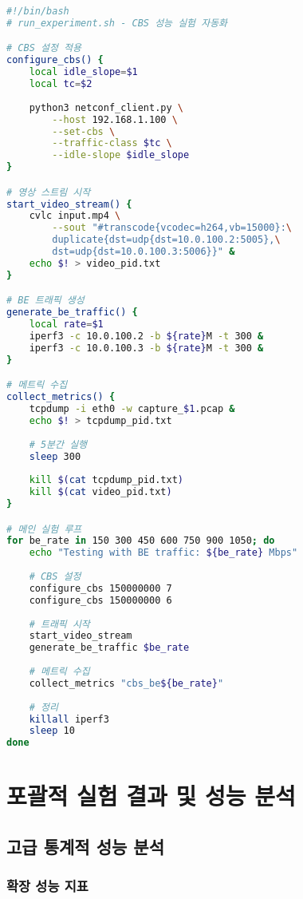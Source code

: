 \documentclass[twocolumn,10pt]{article}
\begin{document}
\begin{lstlisting}[language=bash, caption=실험 자동화 스크립트]
#!/bin/bash
# run_experiment.sh - CBS 성능 실험 자동화

# CBS 설정 적용
configure_cbs() {
    local idle_slope=$1
    local tc=$2
    
    python3 netconf_client.py \
        --host 192.168.1.100 \
        --set-cbs \
        --traffic-class $tc \
        --idle-slope $idle_slope
}

# 영상 스트림 시작
start_video_stream() {
    cvlc input.mp4 \
        --sout "#transcode{vcodec=h264,vb=15000}:\
        duplicate{dst=udp{dst=10.0.100.2:5005},\
        dst=udp{dst=10.0.100.3:5006}}" &
    echo $! > video_pid.txt
}

# BE 트래픽 생성
generate_be_traffic() {
    local rate=$1
    iperf3 -c 10.0.100.2 -b ${rate}M -t 300 &
    iperf3 -c 10.0.100.3 -b ${rate}M -t 300 &
}

# 메트릭 수집
collect_metrics() {
    tcpdump -i eth0 -w capture_$1.pcap &
    echo $! > tcpdump_pid.txt
    
    # 5분간 실행
    sleep 300
    
    kill $(cat tcpdump_pid.txt)
    kill $(cat video_pid.txt)
}

# 메인 실험 루프
for be_rate in 150 300 450 600 750 900 1050; do
    echo "Testing with BE traffic: ${be_rate} Mbps"
    
    # CBS 설정
    configure_cbs 150000000 7
    configure_cbs 150000000 6
    
    # 트래픽 시작
    start_video_stream
    generate_be_traffic $be_rate
    
    # 메트릭 수집
    collect_metrics "cbs_be${be_rate}"
    
    # 정리
    killall iperf3
    sleep 10
done
\end{lstlisting}

\section{포괄적 실험 결과 및 성능 분석}
\label{sec:results}

\subsection{고급 통계적 성능 분석}

\subsubsection{확장 성능 지표}
\end{document}
